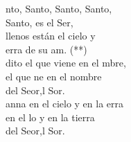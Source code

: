 \documentclass[12pt]{article}
\begin{document}
\begin{multicols*}{2}
\begin{cancion}%
	nto, Santo, Santo, Santo,\\
	Santo, es el Ser,\\
llenos están el cielo y \\
	erra de su am. (**)\\
\jump
	dito el que viene en el mbre,\\
	el que ne en el nombre \\
	del Seor,l Sor. \\
\jump
	anna en el cielo y en la erra\\
	en el lo y en la tierra\\
	del Seor,l Sor. \\
\end{cancion}%


\end{multicols*}
\end{document}
